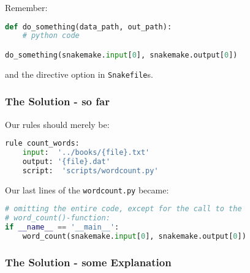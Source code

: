 \begin{frame}[fragile]
  \frametitle{}
  \footnotesize{Remember:}
  \begin{lstlisting}[language=Python,style=Python, basicstyle=\footnotesize]
def do_something(data_path, out_path):
    # python code

do_something(snakemake.input[0], snakemake.output[0])
  \end{lstlisting}
  \footnotesize{and the  directive option in \texttt{Snakefile}s. }
  \vfill
\end{frame}

\begin{frame}[fragile]
  \frametitle{The Solution - so far}
  Our  rules should merely be:
  \begin{lstlisting}[language=Python,style=Python]
rule count_words:
    input:  '../books/{file}.txt'
    output: '{file}.dat'
    script:  'scripts/wordcount.py'
  \end{lstlisting}
  Our last lines of the \texttt{wordcount.py} became:
  \begin{lstlisting}[language=Python,style=Python]
# omitting the entire code, except for the call to the
# word_count()-function:
if __name__ == '__main__':
    word_count(snakemake.input[0], snakemake.output[0])
  \end{lstlisting}
  
\end{frame}

\begin{frame}[fragile]
  \frametitle{The Solution - some Explanation}
  \vfill
  \vfill
\end{frame}






